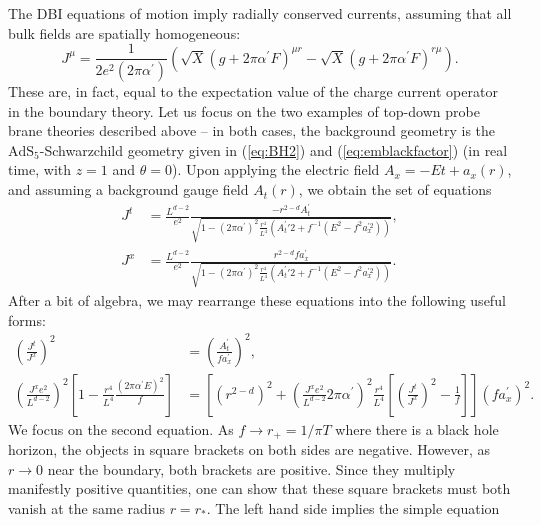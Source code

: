 \documentclass[10pt, oneside]{book}
\begin{document}
\begin{doublespace}
The DBI equations of motion imply radially conserved currents, assuming that all bulk fields are spatially homogeneous:  \begin{equation}
J^\mu = \frac{1}{2e^2(2\pi\alpha^\prime)} \left(\sqrt{X}(g+2\pi\alpha^\prime F)^{\mu r} - \sqrt{X}(g+2\pi\alpha^\prime F)^{r\mu}\right).
\end{equation}
These are, in fact, equal to the expectation value of the charge current operator in the boundary theory.  Let us focus on the two examples of top-down probe brane theories described above -- in both cases, the background geometry is the $\mathrm{AdS}_5$-Schwarzchild geometry given in (\ref{eq:BH2}) and (\ref{eq:emblackfactor})  (in real time, with $z=1$ and $\theta=0$).  Upon applying the electric field $A_x = -Et + a_x(r)$, and assuming  a background gauge field $A_t(r)$, we obtain the set of equations \begin{subequations}\begin{align}
J^t &= \frac{L^{d-2}}{e^2}\frac{-r^{2-d}A_t^\prime}{\sqrt{1-(2\pi\alpha^\prime)^2\frac{r^4}{L^4}\left(A_t^\prime{\prime2} + f^{-1}(E^2-f^2a_x^{\prime2})\right)}} , \\
J^x &= \frac{L^{d-2}}{e^2}\frac{r^{2-d}fa_x^\prime}{\sqrt{1-(2\pi\alpha^\prime)^2\frac{r^4}{L^4}\left(A_t^\prime{\prime2} + f^{-1}(E^2-f^2a_x^{\prime2})\right)}} .
\end{align}\end{subequations}
After a bit of algebra, we may rearrange these equations into the following useful forms: \begin{subequations}\begin{align}
\left(\frac{J^t}{J^x}\right)^2 &= \left(\frac{A_t^\prime}{fa_x^\prime}\right)^2, \\
\left(\frac{J^xe^2}{L^{d-2}}\right)^2 \left[1-\frac{r^4}{L^4}\frac{(2\pi\alpha^\prime E)^2}{f}\right] &= \left[(r^{2-d})^2 + \left(\frac{J^x e^2}{L^{d-2}}2\pi \alpha^\prime \right)^2 \frac{r^4}{L^4} \left[\left(\frac{J^t}{J^x}\right)^2 - \frac{1}{f}\right]\right](fa_x^\prime)^2.
\end{align}\end{subequations}
We focus on the second equation.   As $f\rightarrow r_+ = 1/\pi T$ where there is a black hole horizon, the objects in square brackets on both sides are negative.  However, as $r\rightarrow0$ near the boundary, both brackets are positive.   Since they multiply manifestly positive quantities, one can show that these square brackets must both vanish at the same radius $r=r_*$.   The left hand side implies the simple equation \begin{equation}

\end{equation}
\end{doublespace}
\end{document}
